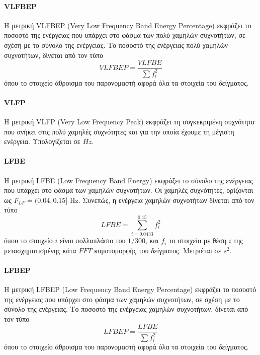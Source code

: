 \paragraph{VLFBEP}
Η μετρική VLFBEP (Very Low Frequency Band Energy Percentage) εκφράζει το ποσοστό της ενέργειας που υπάρχει στο φάσμα των πολύ χαμηλών συχνοτήτων, σε σχέση με το σύνολο της ενέργειας. Το ποσοστό της ενέργειας πολύ χαμηλών συχνοτήτων, δίνεται από τον τύπο
\begin{equation}
\label{eq:vlfbep}
   VLFBEP = \frac{VLFBE}{\sum{f_i^2}}
\end{equation}
όπου το στοιχείο άθροισμα του παρονομαστή αφορά όλα τα στοιχεία του δείγματος.

\paragraph{VLFP}
Η μετρική VLFP (Very Low Frequency Peak) εκφράζει τη συγκεκριμένη συχνότητα που ανήκει στις πολύ χαμηλές συχνότητες και για την οποία έχουμε τη μέγιστη ενέργεια. Υπολογίζεται σε $Hz$.


\paragraph{LFBE}
Η μετρική LFBE (Low Frequency Band Energy) εκφράζει το σύνολο της ενέργειας που υπάρχει στο φάσμα των χαμηλών συχνοτήτων. Οι χαμηλές συχνότητες, ορίζονται ως $F_{LF} = (0.04, 0.15]$ Hz. Συνεπώς, η ενέργεια χαμηλών συχνοτήτων δίνεται από τον τύπο
\begin{equation}
\label{eq:lfbe}
   LFBE = \sum_{i=0.0433}^{0.15}f_i^2
\end{equation}
όπου το στοιχείο $i$ είναι πολλαπλάσιο του $1/300$, και $f_i$ το στοιχείο με θέση $i$ της μετασχηματισμένης κάτα $FFT$ κυματομορφής του δείγματος. Μετριέται σε $s^2$.

\paragraph{LFBEP}
Η μετρική LFBEP (Low Frequency Band Energy Percentage) εκφράζει το ποσοστό της ενέργειας που υπάρχει στο φάσμα των χαμηλών συχνοτήτων, σε σχέση με το σύνολο της ενέργειας. Το ποσοστό της ενέργειας χαμηλών συχνοτήτων, δίνεται από τον τύπο
\begin{equation}
\label{eq:lfbep}
   LFBEP = \frac{LFBE}{\sum{f_i^2}}
\end{equation}
όπου το στοιχείο άθροισμα του παρονομαστή αφορά όλα τα στοιχεία του δείγματος.

